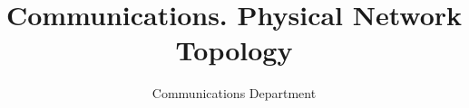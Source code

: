 \documentclass[12pt,a4paper]{article}
\author{Communications Department}
\title{Communications. Physical Network Topology}
\begin{document}
	
	
	
	
	
	{}
	
	
	
\end{document}
